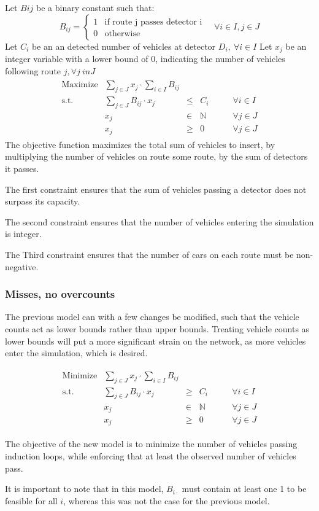 Let $B{ij}$ be a binary constant such that:
\[
  B_{ij} = \begin{cases}
    1 & \text{if route j passes detector i}\\
    0 & \text{otherwise}
  \end{cases}\quad \forall i \in I, j \in J
\]
Let $C_i$ be an an detected number of vehicles at detector $D_i,\ \forall i \in I$
Let $x_j$ be an integer variable with a lower bound of 0, indicating the number of vehicles following route $j, \forall j \ in J$
\begin{align*}
  \begin{array}{rrcll}
    \text{Maximize} & \displaystyle\sum_{j\in J}x_j \cdot \sum_{i\in I}B_{ij}&&&\\
    \text{s.t.} & \displaystyle\sum_{j\in J}B_{ij}\cdot x_j & \leq & C_i & \qquad \forall i \in I\\
    & x_j & \in & \mathbb{N}&\qquad \forall j \in J\\
    & x_j & \geq & 0&\qquad \forall j \in J
  \end{array}
\end{align*}
The objective function maximizes the total sum of vehicles to insert, by multiplying the number of vehicles on route some route, by the sum of detectors it passes. 

The first constraint ensures that the sum of vehicles passing a detector does not surpass its capacity.

The second constraint ensures that the number of vehicles entering the simulation is integer.

The Third constraint ensures that the number of cars on each route must be non-negative.

\subsubsection{Misses, no overcounts}
The previous model can with a few changes be modified, such that the vehicle counts act as lower bounds rather than upper bounds.
Treating vehicle counts as lower bounds will put a more significant strain on the network, as more vehicles enter the simulation, which is desired.

\begin{align*}
  \begin{array}{rrcll}
    \text{Minimize} & \displaystyle\sum_{j\in J}x_j \cdot \sum_{i\in I}B_{ij}&&&\\
    \text{s.t.} & \displaystyle\sum_{j\in J}B_{ij}\cdot x_j & \geq & C_i & \qquad \forall i \in I\\
    & x_j & \in & \mathbb{N}&\qquad \forall j \in J\\
    & x_j & \geq & 0&\qquad \forall j \in J
  \end{array}
\end{align*}

The objective of the new model is to minimize the number of vehicles passing induction loops, while enforcing that at least the observed number of vehicles pass.

It is important to note that in this model, $B_{i\cdot}$ must contain at least one 1 to be feasible for all $i$, whereas this was not the case for the previous model.